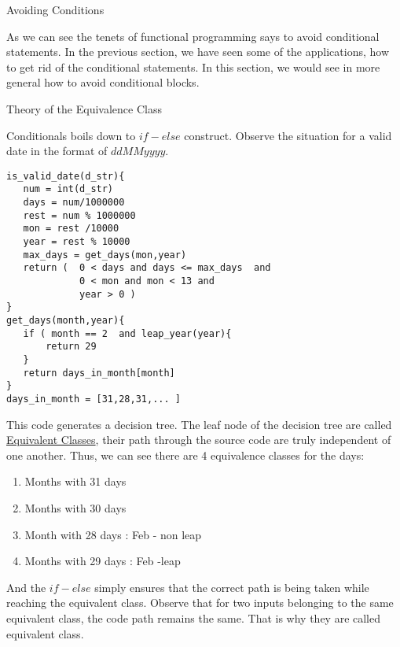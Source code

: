 \begin{section}{Avoiding Conditions}

As we can see the tenets of functional programming says to avoid conditional statements.
In the previous section, we have seen some of the applications, how to get rid of the conditional statements.
In this section, we would see in more general how to avoid conditional blocks.


\begin{subsection}{Theory of the Equivalence Class}

Conditionals boils down to $if-else$ construct.
Observe the situation for a valid date in the format of $ddMMyyyy$.

\begin{center}\begin{minipage}{\linewidth}
\begin{lstlisting}[style=JexlStyle]
is_valid_date(d_str){
   num = int(d_str) 
   days = num/1000000
   rest = num % 1000000
   mon = rest /10000
   year = rest % 10000 
   max_days = get_days(mon,year)  
   return (  0 < days and days <= max_days  and 
             0 < mon and mon < 13 and 
             year > 0 )      
}
get_days(month,year){
   if ( month == 2  and leap_year(year){
       return 29
   }
   return days_in_month[month] 
}
days_in_month = [31,28,31,... ]
\end{lstlisting}
\end{minipage}\end{center}


This code generates a decision tree. The leaf node of the decision tree are
called \href{https://en.wikipedia.org/wiki/Equivalence\_partitioning}{Equivalent Classes}, 
their path through the source code are truly independent of one another.  
Thus, we can see there are 4 equivalence classes for the days:

\begin{enumerate}
\item{Months with 31 days}
\item{Months with 30 days}
\item{Month with 28 days : Feb - non leap}
\item{Months with 29 days : Feb -leap }
\end{enumerate}
 
And the $if - else$ simply ensures that the correct path is being taken
while reaching the equivalent class. Observe that for two inputs belonging 
to the same equivalent class, the code path remains the same.
That is why they are called equivalent class.


\end{subsection}
\end{section}
